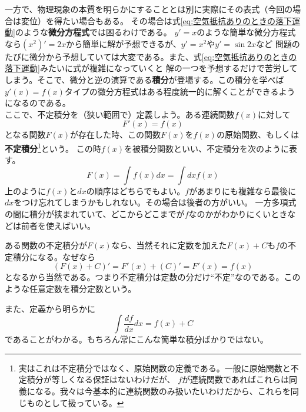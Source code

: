 \documentclass[a4j,dvipdfmx]{jsarticle}
\begin{document}
                一方で、物理現象の本質を明らかにすることとは別に実際にその表式（今回の場合は変位）を得たい場合もある。
                その場合は式\eqref{eq:空気抵抗ありのときの落下運動}のような\textbf{微分方程式}では困るわけである。
                $y'=x$のような簡単な微分方程式なら$(x^2)'=2x$から簡単に解が予想できるが、$y'=x^2$や$y'=\sin 2x$など
                問題のたびに微分から予想していては大変である。また、式\eqref{eq:空気抵抗ありのときの落下運動}みたいに式が複雑になっていくと
                解の一つを予想するだけで苦労してしまう。そこで、微分と逆の演算である\textbf{積分}が登場する。この積分を学べば
                $y'(x)=f(x)$タイプの微分方程式はある程度統一的に解くことができるようになるのである。\\

                ここで、不定積分を（狭い範囲で）定義しよう。ある連続関数$f(x)$に対して
                \begin{equation}
                    F'(x)=f(x) \label{eq:原始関数定義}
                \end{equation}
                となる関数$F(x)$が存在した時、この関数$F(x)$を$f(x)$の原始関数、もしくは\textbf{不定積分}\footnote{実はこれは不定積分ではなく、原始関数の定義である。一般に原始関数と不定積分が等しくなる保証はないわけだが、
                $f$が連続関数であればこれらは同義になる。我々は今基本的に連続関数のみ扱いたいわけだから、これらを同じものとして扱っている。}という。
                この時$f(x)$を被積分関数といい、不定積分を次のように表す。
                \begin{equation}
                    F(x)=\int f(x)dx = \int dx f(x) \label{eq:不定積分の書き方}
                \end{equation}
                上のように$f(x)$と$dx$の順序はどちらでもよい。$f$があまりにも複雑なら最後に$dx$をつけ忘れてしまうかもしれない。その場合は後者の方がいい。
                一方多項式の間に積分が挟まれていて、どこからどこまでが$f$なのかがわかりにくいときなどは前者を使えばいい。

                ある関数の不定積分が$F(x)$なら、当然それに定数を加えた$F(x)+C$も$f$の不定積分になる。なぜなら
                \begin{equation*}
                    (F(x)+C)'=F'(x)+(C)'=F'(x)=f(x)
                \end{equation*}
                となるから当然である。つまり不定積分は定数の分だけ``不定''なのである。このような任意定数を積分定数という。
                
                また、定義から明らかに
                \begin{equation}
                    \int \frac{df}{dx}dx = f(x)+C
                \end{equation}
                であることがわかる。もちろん常にこんな簡単な積分ばかりではない。
\end{document}
